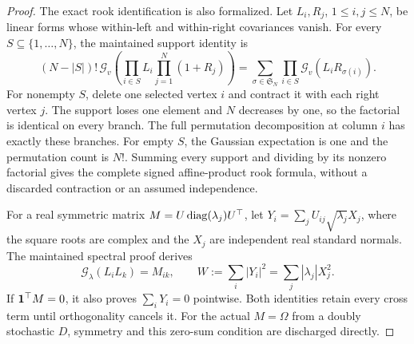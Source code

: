 \begin{proof}
The exact rook identification is also formalized. Let \(L_i,R_j\),
\(1\leq i,j\leq N\), be linear forms whose within-left and within-right
covariances vanish. For every \(S\subseteq\{1,\ldots,N\}\), the maintained
support identity is
\[
 (N-|S|)!\,\mathcal G_v\!\left(
       \prod_{i\in S}L_i\prod_{j=1}^{N}(1+R_j)\right)
 =\sum_{\sigma\in\mathfrak S_N}
       \prod_{i\in S}\mathcal G_v(L_iR_{\sigma(i)}).
\]
For nonempty \(S\), delete one selected vertex \(i\) and contract it
with each right vertex \(j\). The support loses one element and
\(N\) decreases by one, so the factorial is identical on every branch.
The full permutation decomposition at column \(i\) has exactly these
branches. For empty \(S\), the Gaussian expectation is one and
the permutation count is \(N!\). Summing every support and dividing
by its nonzero factorial gives the complete signed affine-product
rook formula, without a discarded contraction or an assumed independence.

For a real symmetric matrix \(M=U\operatorname{diag}(\lambda_j)U^\top\), let
\(Y_i=\sum_jU_{ij}\sqrt{\lambda_j}X_j\), where the square roots
are complex and the \(X_j\) are independent real standard normals.
The maintained spectral proof derives
\[
 \mathcal G_\lambda(L_iL_k)=M_{ik},\qquad
 W:=\sum_i|Y_i|^2=\sum_j|\lambda_j|X_j^2.
\]
If \(\mathbf1^\top M=0\), it also proves \(\sum_iY_i=0\) pointwise.
Both identities retain every cross term until orthogonality cancels it.
For the actual \(M=\Omega\) from a doubly stochastic \(D\),
symmetry and this zero-sum condition are discharged directly.


\end{proof}
